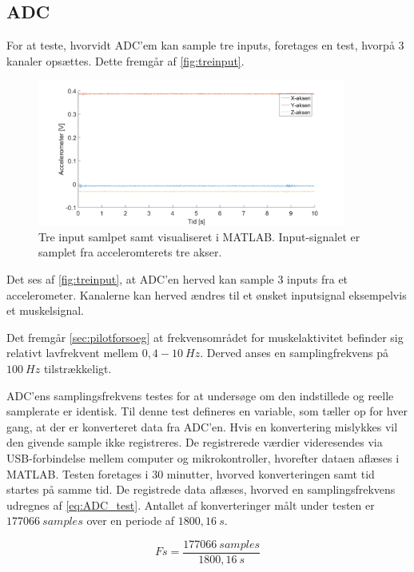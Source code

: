 \subsection{ADC}

For at teste, hvorvidt ADC'em kan sample tre inputs, foretages en test, hvorpå 3 kanaler opsættes. Dette fremgår af \autoref{fig:treinput}.

\begin{figure}[H]
\centering
\includegraphics[width=0.9\textwidth]{figures/treinput}
\caption{Tre input samlpet samt visualiseret i MATLAB. Input-signalet er samplet fra acceleromterets tre akser.}
\label{fig:treinput}
\end{figure}

Det ses af \autoref{fig:treinput}, at ADC'en herved kan sample 3 inputs fra et accelerometer. Kanalerne kan herved ændres til et ønsket inputsignal eksempelvis et muskelsignal. 

Det fremgår \autoref{sec:pilotforsoeg} at frekvensområdet for muskelaktivitet befinder sig relativt lavfrekvent mellem $0,4-10~Hz$. Derved anses en samplingfrekvens på $100~Hz$ tilstrækkeligt. 

ADC'ens samplingsfrekvens testes for at undersøge om den indstillede og reelle samplerate er identisk. Til denne test defineres en variable, som tæller op for hver gang, at der er konverteret data fra ADC'en. Hvis en konvertering mislykkes vil den givende sample ikke registreres. De registrerede værdier videresendes via USB-forbindelse mellem computer og mikrokontroller, hvorefter dataen aflæses i MATLAB. 
Testen foretages i 30 minutter, hvorved konverteringen samt tid startes på samme tid. De registrede data aflæses, hvorved en samplingsfrekvens udregnes af \autoref{eq:ADC_test}. Antallet af konverteringer målt under testen er $177066~samples$ over en periode af $1800,16~s$.

\begin{equation}\label{eq:ADC_test}
Fs = \frac{177066~samples}{1800,16~s}
\end{equation}

